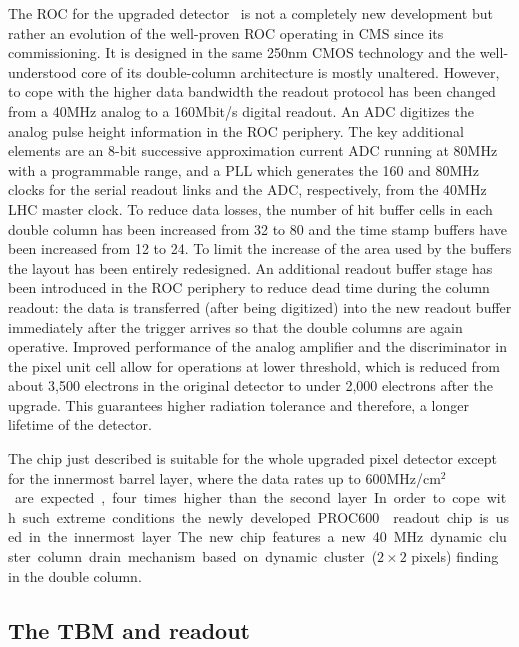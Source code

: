 The ROC for the upgraded detector~\cite{Kastli201388} is not a completely new development but rather an evolution of the well-proven ROC operating in CMS since its commissioning.
It is designed in the same 250\unit{nm} CMOS technology and the well-understood core of its double-column architecture is mostly unaltered.
However, to cope with the higher data bandwidth the readout protocol has been changed from a 40\unit{MHz} analog to a 160\unit{Mbit/s} digital readout. An ADC digitizes the analog pulse height information in the ROC periphery.
The key additional elements are an 8-bit successive approximation current ADC running at 80\unit{MHz} with a programmable range, and a PLL which generates the 160 and 80\unit{MHz} clocks for the serial readout links and the ADC, respectively, from the 40\unit{MHz} LHC master clock.
To reduce data losses, the number of hit buffer cells in each double column has been increased from 32 to 80 and the time stamp buffers have been increased from 12 to 24.
To limit the increase of the area used by the buffers the layout has been entirely redesigned.
An additional readout buffer stage has been introduced in the ROC periphery to reduce dead time during the column readout: the data is transferred (after being digitized) into the new readout buffer immediately after the trigger arrives so that the double columns are again operative.
Improved performance of the analog amplifier and the discriminator in the pixel unit cell allow for operations at lower threshold, which is reduced from about 3,500 electrons in the original detector to under 2,000 electrons after the upgrade. This guarantees higher radiation tolerance and therefore, a longer lifetime of the detector.

The chip just described is suitable for the whole upgraded pixel detector except for the innermost barrel layer, where the data rates up to 600\unit{MHz/cm$^2$} are expected, four times higher than the second layer.
In order to cope with such extreme conditions the newly developed PROC600~\cite{Starodumov:2227967} readout chip is used in the innermost layer. The new chip features a new 40\unit{MHz} dynamic cluster column drain mechanism based on dynamic cluster ($2\times2$ pixels) finding in the double column.

\subsection{The TBM and readout}\label{subsec:Phase1TBM}

